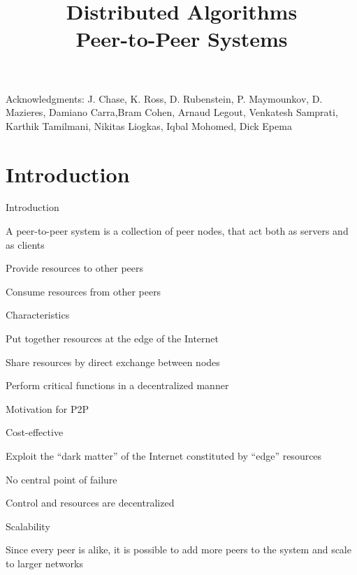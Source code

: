 \title[DS - P2P]{\textbf{Distributed Algorithms}\\Peer-to-Peer Systems}



\newcommand{\ID}{\mathit{ID}}

\begin{frame}
\titlepage

{\tiny
Acknowledgments: J. Chase, K. Ross, D. Rubenstein, P. Maymounkov, D. Mazieres, Damiano Carra,Bram Cohen, Arnaud Legout, Venkatesh Samprati, Karthik Tamilmani, Nikitas Liogkas, Iqbal Mohomed, Dick Epema
}


\end{frame}




\section{Introduction}

\begin{frame}{Introduction}

\begin{definition}
A peer-to-peer system is a collection of \alert{peer} nodes, that act
both as servers and as clients
\BI
\item Provide resources to other peers
\item Consume resources from other peers
\EI
\end{definition}

\smallskip
\begin{block}{Characteristics}
\BI
\item Put together resources at the edge of the Internet
\item Share resources by direct exchange between nodes
\item Perform critical functions in a decentralized manner
\EI
\end{block}
\end{frame}

\begin{frame}{Motivation for P2P}

\BIL
\item \alert{Cost-effective}
	\BI
	\item Exploit the “dark matter” of the Internet constituted by “edge” resources
	\EI
\item \alert{No central point of failure}
	\BI
	\item Control and resources are decentralized
	\EI
\item \alert{Scalability}
\BI
\item Since every peer is alike, it is possible to add more peers to the system and scale to larger networks
\EI
\EIL
\end{frame}

